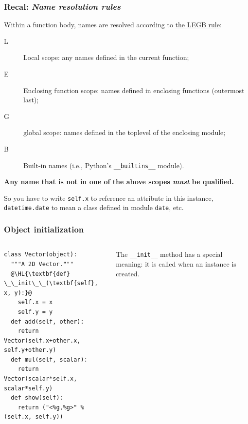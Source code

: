 \documentclass[english,serif,mathserif,xcolor=pdftex,dvipsnames,table]{beamer}
\begin{document}
\begin{frame}[fragile]
  \frametitle{Recal: \emph{Name resolution rules}}
  \small

  Within a function body, names are resolved according to \href{http://stackoverflow.com/questions/291978/short-description-of-python-scoping-rules/292502#292502}{the LEGB rule}:
  \begin{description}
  \item[L] Local scope: any names defined in the current function;
  \item[E] Enclosing function scope: names defined in enclosing
    functions (outermost last);
  \item[G] global scope: names defined in the toplevel of the enclosing module;
  \item[B] Built-in names (i.e., Python's \texttt{\_\_builtins\_\_} module).
  \end{description}

  \+
  \textbf{Any name that is not in one of the above scopes \emph{must}
    be qualified.}

  \+
  So you have to write \texttt{self.x} to reference an attribute in
  this instance, \texttt{datetime.date} to mean a class defined in module
  \texttt{date}, etc.

\end{frame}


\begin{frame}[fragile]
  \frametitle{Object initialization}
  \begin{columns}[t]
    \begin{column}{0.5\textwidth}
\begin{lstlisting}
class Vector(object):
  """A 2D Vector."""
  @\HL{\textbf{def} \_\_init\_\_(\textbf{self}, x, y):}@
    self.x = x
    self.y = y
  def add(self, other):
    return Vector(self.x+other.x, self.y+other.y)
  def mul(self, scalar):
    return Vector(scalar*self.x, scalar*self.y)
  def show(self):
    return ("<%g,%g>" % (self.x, self.y))
\end{lstlisting}
    \end{column}
    \begin{column}{0.5\textwidth}
      \raggedleft
      The \lstinline|__init__| method has a special
      meaning: it is called when an instance is created.
    \end{column}
  \end{columns}
\end{frame}
\end{document}

